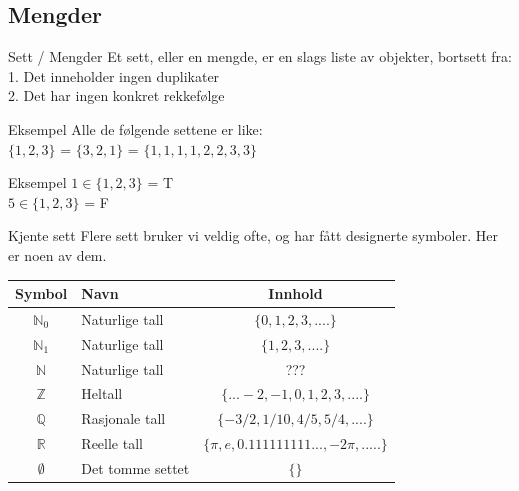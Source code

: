 \subsection{Mengder}
\begin{frame}{Sett / Mengder}
    Et sett, eller en mengde, er en slags liste av objekter, bortsett fra:\\
    \indent \hspace{3mm}    1. Det inneholder ingen duplikater\\
    \indent \hspace{3mm}    2. Det har ingen konkret rekkefølge
    
    \pause
    \begin{block}{Eksempel}
        Alle de følgende settene er like: \\
        $\{1, 2, 3\}$ = $\{3, 2, 1\}$ = $\{1, 1, 1, 1, 2, 2, 3, 3\}$
    \end{block}
    
    \pause
    \begin{block}{Eksempel}
        $1 \in \{1, 2, 3\}$ = T \\
        $5 \in \{1, 2, 3\}$ = F
    \end{block}
\end{frame}


\begin{frame}{Kjente sett}
    Flere sett bruker vi veldig ofte, og har fått designerte symboler. Her er noen av dem.\\
    
    \begin{tabular}{c|l|c}
        Symbol & Navn & Innhold \\ \hline
        $\mathbb{N}_0$ & Naturlige tall & $\{0, 1, 2, 3, ....\}$\\
        \pause
        $\mathbb{N}_1$ & Naturlige tall & $\{1, 2, 3, ....\}$\\
        \pause
        $\mathbb{N}$ & Naturlige tall & ???\\
        \pause
        $\mathbb{Z}$ & Heltall & $\{... -2, -1, 0, 1, 2, 3, ....\}$\\
        \pause
        $\mathbb{Q}$ & Rasjonale tall & $\{-3/2, 1/10, 4/5, 5/4, ....\}$\\
        \pause
        $\mathbb{R}$ & Reelle tall & $\{\pi, e, 0.111111111..., -2\pi, .....\}$\\
        \pause
        $\emptyset$ & Det tomme settet & $\{\}$
    \end{tabular}
\end{frame}


